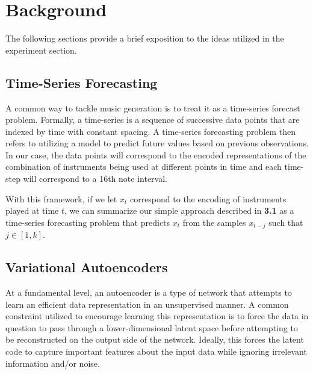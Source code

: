 \documentclass[10pt,twocolumn]{article}
\begin{document}
\section{Background}
The following sections provide a brief exposition to the ideas utilized in the experiment section. 

\subsection{Time-Series Forecasting}
A common way to tackle music generation is to treat it as a time-series forecast problem. Formally, a time-series is a sequence of successive data points that are indexed by time with constant spacing. A time-series forecasting problem then refers to utilizing a model to predict future values based on previous observations. In our case, the data points will correspond to the encoded representations of the combination of instruments being used at different points in time and each time-step will correspond to a 16th note interval. 

With this framework, if we let $x_t$ correspond to the encoding of instruments played at time $t$, we can summarize our simple approach described in \textbf{3.1} as a time-series forecasting problem that predicts $x_{t}$ from the samples $x_{t - j}$ such that $j \in [1, k]$.

\subsection{Variational Autoencoders}

At a fundamental level, an autoencoder is a type of network that attempts to learn an efficient data representation in an unsupervised manner. A common constraint utilized to encourage learning this representation is to force the data in question to pass through a lower-dimensional latent space before attempting to be reconstructed on the output side of the network. Ideally, this forces the latent code to capture important features about the input data while ignoring irrelevant information and/or noise.

\begin{figure}[H]
\end{figure}
\end{document}
